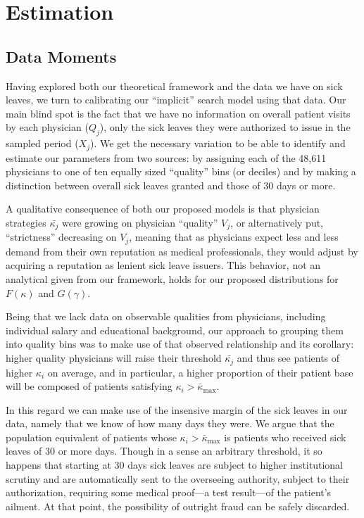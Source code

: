 \documentclass[../main.tex]{subfiles}
\begin{document}
\section{Estimation}

\subsection{Data Moments}

Having explored both our theoretical framework and the data we have on sick leaves, we turn to calibrating our ``implicit'' search model using that data. Our main blind spot is the fact that we have no information on overall patient visits by each physician ($Q_j$), only the sick leaves they were authorized to issue in the sampled period ($X_j$). We get the necessary variation to be able to identify and estimate our parameters from two sources: by assigning each of the 48,611 physicians to one of ten equally sized ``quality'' bins (or deciles) and by making a distinction between overall sick leaves granted and those of 30 days or more.

A qualitative consequence of both our proposed models is that physician strategies $\bar{\kappa_j}$ were growing on physician ``quality'' $V_j$, or alternatively put, ``strictness'' decreasing on $V_j$, meaning that as physicians expect less and less demand from their own reputation as medical professionals, they would adjust by acquiring a reputation as lenient sick leave issuers. This behavior, not an analytical given from our framework, holds for our proposed distributions for $F(\kappa)$ and $G(\gamma)$.

Being that we lack data on observable qualities from physicians, including individual salary and educational background, our approach to grouping them into quality bins was to make use of that observed relationship and its corollary: higher quality physicians will raise their threshold $\bar{\kappa_j}$ and thus see patients of higher $\kappa_i$ on average, and in particular, a higher proportion of their patient base will be composed of patients satisfying $\kappa_i > \bar{\kappa}_{\max}$.

In this regard we can make use of the insensive margin of the sick leaves in our data, namely that we know of how many days they were. We argue that the population equivalent of patients whose $\kappa_i > \bar{\kappa}_{\max}$ is patients who received sick leaves of 30 or more days. Though in a sense an arbitrary threshold, it so happens that starting at 30 days sick leaves are subject to higher institutional scrutiny and are automatically sent to the overseeing authority, subject to their authorization, requiring some medical proof—a test result—of the patient's ailment. At that point, the possibility of outright fraud can be safely discarded.
\end{document}
